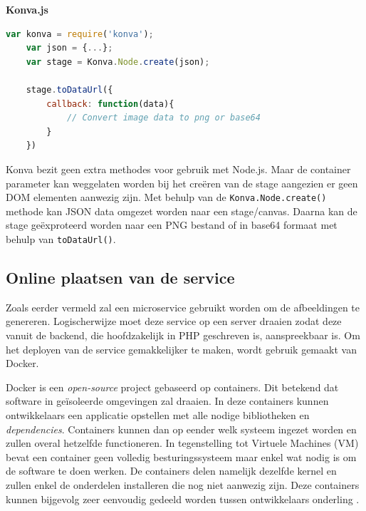 \textbf{Konva.js}
\begin{lstlisting}[caption={JSON naar een afbeelding in Konva.js},label=lst:KonvaJSONToImage,language=javascript]
	var konva = require('konva');
	var json = {...};
	var stage = Konva.Node.create(json);
	
	stage.toDataUrl({
		callback: function(data){
			// Convert image data to png or base64 
		}
	})
\end{lstlisting} %
Konva bezit geen extra methodes voor gebruik met Node.js. Maar de container parameter kan weggelaten worden bij het cre\"{e}ren van de stage aangezien er geen DOM elementen aanwezig zijn. Met behulp van de \texttt{Konva.Node.create()} methode kan JSON data omgezet worden naar een stage/canvas. Daarna kan de stage ge\"{e}xproteerd worden naar een PNG bestand of in base64 formaat met behulp van \texttt{toDataUrl()}. 

\subsection{Online plaatsen van de service}
Zoals eerder vermeld zal een microservice gebruikt worden om de afbeeldingen te genereren. Logischerwijze moet deze service op een server draaien zodat deze vanuit de backend, die hoofdzakelijk in PHP geschreven is, aanspreekbaar is. Om het deployen van de service gemakkelijker te maken, wordt gebruik gemaakt van Docker. 

Docker is een \textit{open-source} project gebaseerd op containers. Dit betekend dat software in ge\"{i}soleerde omgevingen zal draaien. In deze containers kunnen ontwikkelaars een applicatie opstellen met alle nodige bibliotheken en \textit{dependencies}. Containers kunnen dan op eender welk systeem ingezet worden en zullen overal hetzelfde functioneren. In tegenstelling tot Virtuele Machines (VM) bevat een container geen volledig besturingssysteem maar enkel wat nodig is om de software te doen werken. De containers delen namelijk dezelfde kernel en zullen enkel de onderdelen installeren die nog niet aanwezig zijn. Deze containers kunnen bijgevolg zeer eenvoudig gedeeld worden tussen ontwikkelaars onderling \cite{DockerWhatDocker}. 

